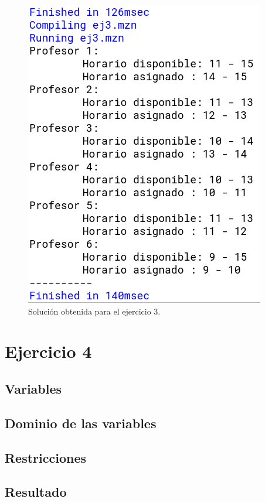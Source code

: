 \documentclass[11pt, spanish]{article}
\begin{document}
\begin{figure}[H]
  \centering
      \includegraphics[scale = 0.30]{sol3.png}
 		 \caption{Solución obtenida para el ejercicio 3.}
  		\label{fig:ej3}

\end{figure}

\section{Ejercicio 4}


\subsection{Variables}

\subsection{Dominio de las variables}

\subsection{Restricciones}

\subsection{Resultado}
\end{document}
